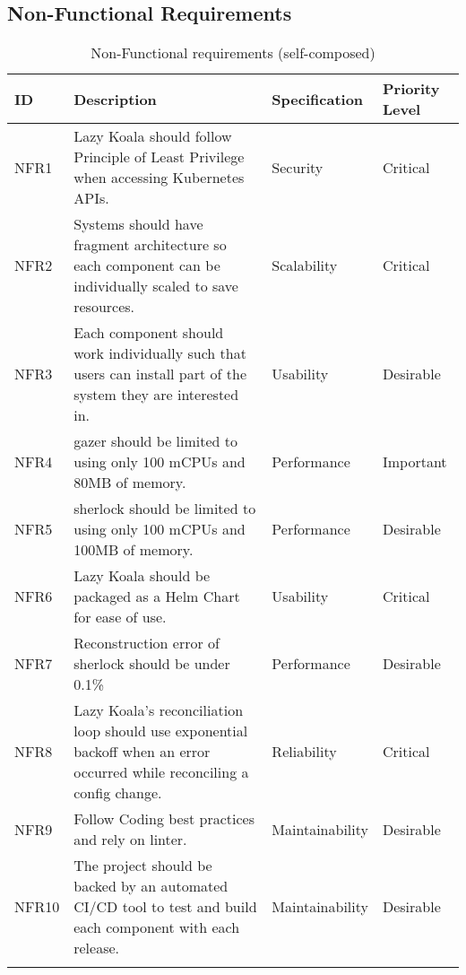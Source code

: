 \subsection{Non-Functional Requirements}

\begin{longtable}{|p{13mm}|p{89mm}|p{26mm}|p{18mm}|}
\hline
    \textbf{ID} &
    \textbf{Description} &
    \textbf{Specification} &
    \textbf{Priority Level} \\ \hline
    
    NFR1 &
    Lazy Koala should follow Principle of Least Privilege when accessing Kubernetes APIs. &
    Security &
    Critical \\ \hline
    
    NFR2 &
    Systems should have fragment architecture so each component can be individually scaled to save resources. &
    Scalability &
    Critical \\ \hline
    
    NFR3 &
    Each component should work individually such that users can install part of the system they are interested in. &
    Usability &
    Desirable \\ \hline
    
    NFR4 &
    \ac{gazer} should be limited to using only 100 mCPUs and 80MB of memory. &
    Performance &
    Important \\ \hline
    
    NFR5 &
    \ac{sherlock} should be limited to using only 100 mCPUs and 100MB of memory. &
    Performance &
    Desirable \\ \hline
    
    NFR6 &
    Lazy Koala should be packaged as a Helm Chart for ease of use. &
    Usability &
    Critical \\ \hline
    
    NFR7 &
    Reconstruction error of \ac{sherlock} should be under 0.1\% &
    Performance &
    Desirable \\ \hline
    
    NFR8 &
    Lazy Koala’s reconciliation loop should use exponential backoff when an error occurred while reconciling a config change. &
    Reliability &
    Critical \\ \hline
    
    NFR9 &
    Follow Coding best practices and rely on linter. &
    Maintainability &
    Desirable \\ \hline
    
    NFR10 &
    The project should be backed by an automated CI/CD tool to test and build each component with each release. &
    Maintainability &
    Desirable \\ \hline

\caption{Non-Functional requirements (self-composed)}
\end{longtable}